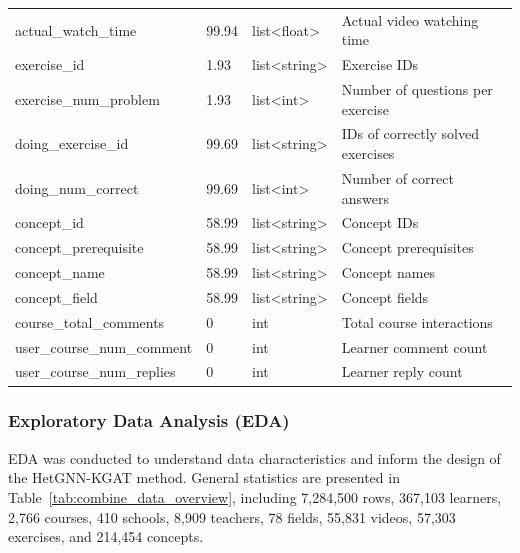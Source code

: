 \documentclass{ieeeaccess}
\begin{document}
\begin{table}[!t]
{\begin{tabular}{|p{3.2cm}|p{1cm}|p{2cm}|p{2.5cm}|}
actual\_watch\_time & 99.94 & list<float> & Actual video watching time \\
exercise\_id & 1.93 & list<string> & Exercise IDs \\
exercise\_num\_problem & 1.93 & list<int> & Number of questions per exercise \\
doing\_exercise\_id & 99.69 & list<string> & IDs of correctly solved exercises \\
doing\_num\_correct & 99.69 & list<int> & Number of correct answers \\
concept\_id & 58.99 & list<string> & Concept IDs \\
concept\_prerequisite & 58.99 & list<string> & Concept prerequisites \\
concept\_name & 58.99 & list<string> & Concept names \\
concept\_field & 58.99 & list<string> & Concept fields \\
course\_total\_comments & 0 & int & Total course interactions \\
user\_course\_num\_comment & 0 & int & Learner comment count \\
user\_course\_num\_replies & 0 & int & Learner reply count \\
\hline
\end{tabular}
}
\end{table}

\subsubsection{Exploratory Data Analysis (EDA)}

EDA was conducted to understand data characteristics and inform the design of the HetGNN-KGAT method. General statistics are presented in Table~\ref{tab:combine_data_overview}, including 7,284,500 rows, 367,103 learners, 2,766 courses, 410 schools, 8,909 teachers, 78 fields, 55,831 videos, 57,303 exercises, and 214,454 concepts.

\begin{table}[!t]
\centering
\caption{Overview of consolidated data}
\label{tab:combine_data_overview}
\renewcommand{\arraystretch}{1.2}
\end{table}
\end{document}
